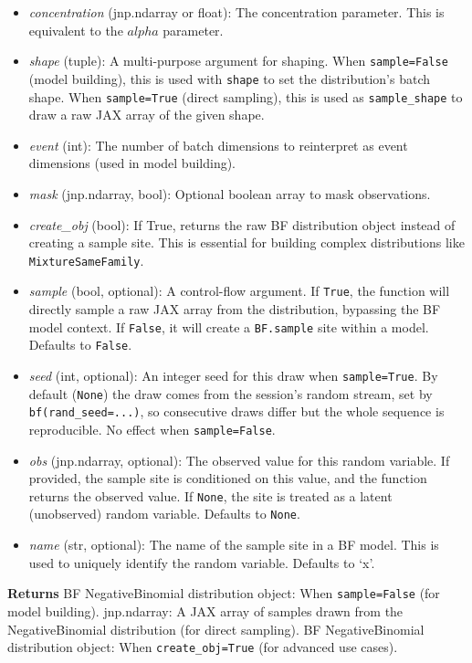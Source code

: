 \documentclass[
  letterpaper,
  DIV=11,
  numbers=noendperiod]{scrartcl}
\begin{document}
\begin{itemize}
\item
  \emph{concentration} (jnp.ndarray or float): The concentration
  parameter. This is equivalent to the \(alpha\) parameter.
\item
  \emph{shape} (tuple): A multi-purpose argument for shaping. When
  \texttt{sample=False} (model building), this is used with
  \texttt{shape} to set the distribution's batch shape. When
  \texttt{sample=True} (direct sampling), this is used as
  \texttt{sample\_shape} to draw a raw JAX array of the given shape.
\item
  \emph{event} (int): The number of batch dimensions to reinterpret as
  event dimensions (used in model building).
\item
  \emph{mask} (jnp.ndarray, bool): Optional boolean array to mask
  observations.
\item
  \emph{create\_obj} (bool): If True, returns the raw BF distribution
  object instead of creating a sample site. This is essential for
  building complex distributions like \texttt{MixtureSameFamily}.
\item
  \emph{sample} (bool, optional): A control-flow argument. If
  \texttt{True}, the function will directly sample a raw JAX array from
  the distribution, bypassing the BF model context. If \texttt{False},
  it will create a \texttt{BF.sample} site within a model. Defaults to
  \texttt{False}.
\item
  \emph{seed} (int, optional): An integer seed for this draw when
  \texttt{sample=True}. By default (\texttt{None}) the draw comes from
  the session's random stream, set by \texttt{bf(rand\_seed=...)}, so
  consecutive draws differ but the whole sequence is reproducible. No
  effect when \texttt{sample=False}.
\item
  \emph{obs} (jnp.ndarray, optional): The observed value for this random
  variable. If provided, the sample site is conditioned on this value,
  and the function returns the observed value. If \texttt{None}, the
  site is treated as a latent (unobserved) random variable. Defaults to
  \texttt{None}.
\item
  \emph{name} (str, optional): The name of the sample site in a BF
  model. This is used to uniquely identify the random variable. Defaults
  to `x'.
\end{itemize}

\textbf{Returns} BF NegativeBinomial distribution object: When
\texttt{sample=False} (for model building). jnp.ndarray: A JAX array of
samples drawn from the NegativeBinomial distribution (for direct
sampling). BF NegativeBinomial distribution object: When
\texttt{create\_obj=True} (for advanced use cases).
\end{document}
